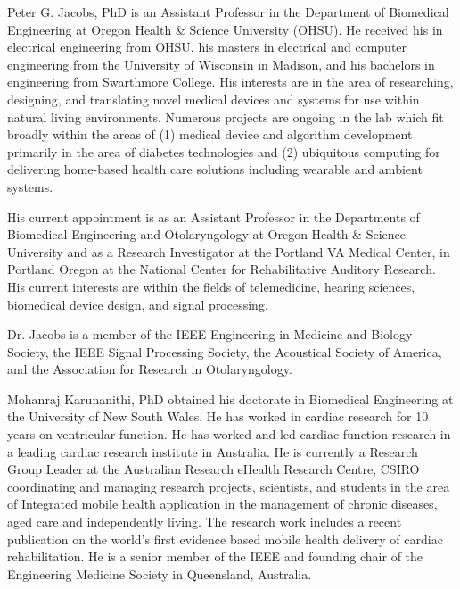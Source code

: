\documentclass[journal]{IEEEtran}
\begin{document}
\begin{IEEEbiography}
{Peter G. Jacobs, PhD}
is an Assistant Professor in the Department of Biomedical Engineering at Oregon Health \& Science University (OHSU).  He received his in electrical engineering from OHSU, his masters in electrical and computer engineering from the University of Wisconsin in Madison, and his bachelors in engineering from Swarthmore College. His interests are in the area of researching, designing, and translating novel medical devices and systems for use within natural living environments.  Numerous projects are ongoing in the lab which fit broadly within the areas of (1) medical device and algorithm development primarily in the area of diabetes technologies and (2) ubiquitous computing for delivering home-based health care solutions including wearable and ambient systems.                 

His current appointment is as an Assistant Professor in the Departments of Biomedical Engineering and Otolaryngology at Oregon Health \& Science University and as a Research Investigator at the Portland VA Medical Center, in Portland Oregon at the National Center for Rehabilitative Auditory Research.  His current interests are within the fields of telemedicine, hearing sciences, biomedical device design, and signal processing.

Dr. Jacobs is a member of the IEEE Engineering in Medicine and Biology Society, the IEEE Signal Processing Society, the Acoustical Society of America, and the Association for Research in Otolaryngology.  
\end{IEEEbiography}
\vspace{-1.4 cm}
\begin{IEEEbiography}
{Mohanraj Karunanithi, PhD}
obtained his doctorate in Biomedical Engineering at the University of New South Wales. He has worked in cardiac research for 10 years on ventricular function. He has worked and led cardiac function research in a leading cardiac research institute in Australia. He is currently a Research Group Leader at the Australian Research eHealth Research Centre, CSIRO coordinating and managing research projects, scientists, and students in the area of Integrated mobile health application in the management of chronic diseases, aged care and independently living. The research work includes a recent publication on the world’s first evidence based mobile health delivery of cardiac rehabilitation.  He is a senior member of the IEEE and founding chair of the Engineering Medicine Society in Queensland, Australia.\end{IEEEbiography}
\end{document}
